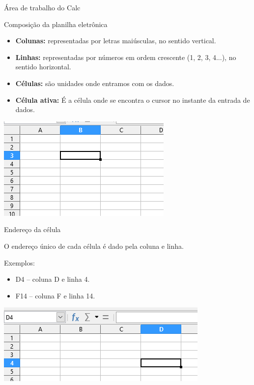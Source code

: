\begin{frame}{Área de trabalho do Calc}
	\begin{block}{Composição da planilha eletrônica}
		\begin{itemize}
			\item \textbf{Colunas:} representadas por letras maiúsculas, no sentido vertical.
			\item \textbf{Linhas:} representadas por números em ordem crescente (1, 2, 3, 4...), no sentido horizontal.
			\item \textbf{Células:} são unidades onde entramos com os dados.
			\item \textbf{Célula ativa:} É a célula onde se encontra o cursor no instante da entrada de dados.
		\end{itemize}
	\end{block}
	
	\centering
	\includegraphics[width=0.5\linewidth]{Figuras/Ch06/fig3}
\end{frame}


\begin{frame}{Endereço da célula}
	\begin{block}{}
		O endereço único de cada célula é dado pela coluna e linha.
		
		\medskip
		
		Exemplos:
		\begin{itemize}
			\item D4 – coluna D e linha 4.
			\item F14 – coluna F e linha 14.
		\end{itemize}
	\end{block}
	
	\bigskip
	
	\centering
	\includegraphics[width=1\linewidth]{Figuras/Ch06/fig4}
\end{frame}


